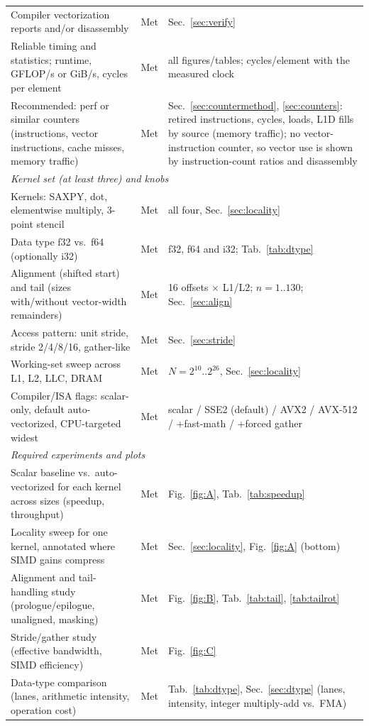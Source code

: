 \documentclass{article}
\begin{document}
\begin{center}
\begin{longtable}{p{6.3cm}p{1.5cm}p{7.7cm}}
Compiler vectorization reports and/or disassembly & Met & Sec.~\ref{sec:verify} \\
Reliable timing and statistics; runtime, GFLOP/s or GiB/s, cycles per element & Met & all figures/tables; cycles/element with the measured clock \\
Recommended: perf or similar counters (instructions, vector instructions, cache misses, memory traffic) & Met & Sec.~\ref{sec:countermethod}, \ref{sec:counters}: retired instructions, cycles, loads, L1D fills by source (memory traffic); no vector-instruction counter, so vector use is shown by instruction-count ratios and disassembly \\
\midrule
\multicolumn{3}{l}{\textit{Kernel set (at least three) and knobs}} \\
Kernels: SAXPY, dot, elementwise multiply, 3-point stencil & Met & all four, Sec.~\ref{sec:locality} \\
Data type f32 vs.\ f64 (optionally i32) & Met & f32, f64 and i32; Tab.~\ref{tab:dtype} \\
Alignment (shifted start) and tail (sizes with/without vector-width remainders) & Met & 16 offsets $\times$ L1/L2; $n=1..130$; Sec.~\ref{sec:align} \\
Access pattern: unit stride, stride 2/4/8/16, gather-like & Met & Sec.~\ref{sec:stride} \\
Working-set sweep across L1, L2, LLC, DRAM & Met & $N=2^{10}..2^{26}$, Sec.~\ref{sec:locality} \\
Compiler/ISA flags: scalar-only, default auto-vectorized, CPU-targeted widest & Met & scalar / SSE2 (default) / AVX2 / AVX-512 / +fast-math / +forced gather \\
\midrule
\multicolumn{3}{l}{\textit{Required experiments and plots}} \\
Scalar baseline vs.\ auto-vectorized for each kernel across sizes (speedup, throughput) & Met & Fig.~\ref{fig:A}, Tab.~\ref{tab:speedup} \\
Locality sweep for one kernel, annotated where SIMD gains compress & Met & Sec.~\ref{sec:locality}, Fig.~\ref{fig:A} (bottom) \\
Alignment and tail-handling study (prologue/epilogue, unaligned, masking) & Met & Fig.~\ref{fig:B}, Tab.~\ref{tab:tail}, \ref{tab:tailrot} \\
Stride/gather study (effective bandwidth, SIMD efficiency) & Met & Fig.~\ref{fig:C} \\
Data-type comparison (lanes, arithmetic intensity, operation cost) & Met & Tab.~\ref{tab:dtype}, Sec.~\ref{sec:dtype} (lanes, intensity, integer multiply-add vs.\ FMA) \\

\end{longtable}
\end{center}
\end{document}
